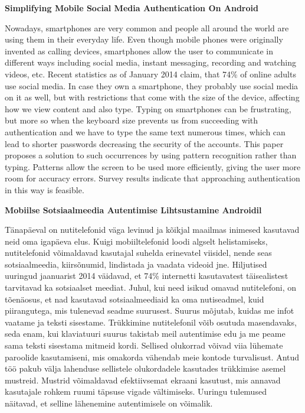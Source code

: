 \noindent\textbf{\large Simplifying Mobile Social Media Authentication On Android}
\vspace*{2ex}
{}

\noindent Nowadays, smartphones are very common and people all around the world are using them in their everyday life. Even though mobile phones were originally invented as calling devices, smartphones allow the user to communicate in different ways including social media, instant messaging, recording and watching videos, etc. Recent statistics as of January 2014 claim, that 74\% of online adults use social media. In case they own a smartphone, they probably use social media on it as well, but with restrictions that come with the size of the device, affecting how we view content and also type. Typing on smartphones can be frustrating, but more so when the keyboard size prevents us from succeeding with authentication and we have to type the same text numerous times, which can lead to shorter passwords decreasing the security of the accounts. This paper proposes a solution to such occurrences by using pattern recognition rather than typing. Patterns allow the screen to be used more efficiently, giving the user more room for accuracy errors. Survey results indicate that approaching authentication in this way is feasible.


\vspace*{2ex}

{}

\vspace*{3ex}

\noindent\textbf{\large Mobiilse Sotsiaalmeedia Autentimise Lihtsustamine Androidil}
\vspace*{2ex}
{}

\noindent T\"{a}nap\"{a}eval on nutitelefonid v\"{a}ga levinud ja k\~{o}ikjal maailmas inimesed kasutavad neid oma igap\"{a}eva elus. Kuigi mobiiltelefonid loodi algselt helistamiseks, nutitelefonid v\~{o}imaldavad kasutajal suhelda erinevatel viisidel, nende seas sotsiaalmeedia, kiirs\~{o}numid, lindistada ja vaadata videoid jne. Hiljutised uuringud jaanuarist 2014 v\"{a}idavad, et 74\% internetti kasutavatest t\"{a}isealistest tarvitavad ka sotsiaalset meediat. Juhul, kui need isikud omavad nutitelefoni, on t\~{o}en\"{a}osus, et nad kasutavad sotsiaalmeediaid ka oma nutiseadmel, kuid piirangutega, mis tulenevad seadme suurusest. Suurus m\~{o}jutab, kuidas me infot vaatame ja teksti sisestame. Tr\"{u}kkimine nutitelefonil v\~{o}ib osutuda masendavaks, seda enam, kui klaviatuuri suurus takistab meil autentimise edu ja me peame sama teksti sisestama mitmeid kordi. Sellised olukorrad v\~{o}ivad viia l\"{u}hemate paroolide kasutamiseni, mis omakorda v\"{a}hendab meie kontode turvalisust. Antud t\"{o}\"{o} pakub v\"{a}lja lahenduse sellistele olukordadele kasutades tr\"{u}kkimise asemel mustreid. Mustrid v\~{o}imaldavad efektiivsemat ekraani kasutust, mis annavad kasutajale rohkem ruumi t\"{a}psuse vigade v\"{a}ltimiseks. Uuringu tulemused n\"{a}itavad, et selline l\"{a}henemine autentimisele on v\~{o}imalik.

\vspace*{2ex}

{}
